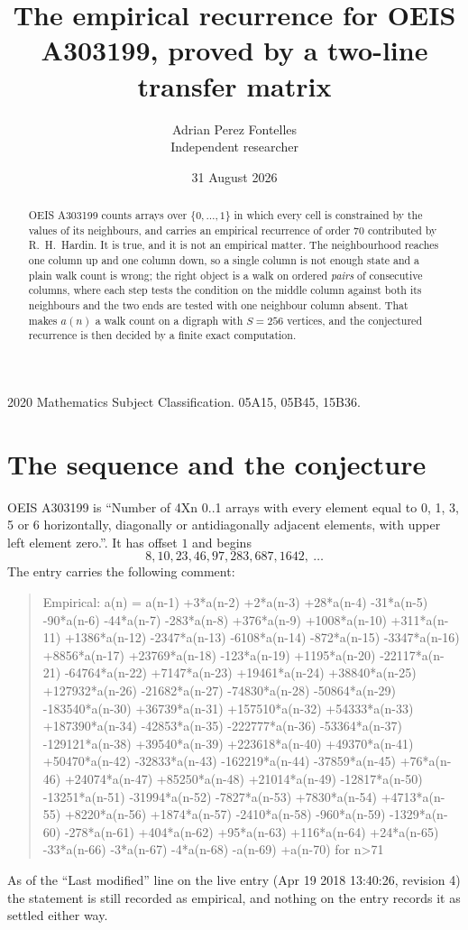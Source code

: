 \documentclass[11pt,a4paper]{article}
\title{The empirical recurrence for OEIS A303199, proved by a two-line transfer matrix}
\author{Adrian Perez Fontelles\\ \small Independent researcher}
\date{31 August 2026}
\theoremstyle{plain}
\theoremstyle{definition}
\begin{document}
\maketitle

\begin{abstract}
OEIS A303199 counts arrays over $\{0,\dots,1\}$ in which every cell is constrained by the
values of its neighbours, and carries an empirical recurrence of order $70$ contributed
by R.~H.~Hardin. It is true, and it is not an empirical matter. The neighbourhood reaches one
column up and one column down, so a single column is not enough state and a plain walk count
is wrong; the right object is a walk on ordered \emph{pairs} of consecutive columns, where
each step tests the condition on the middle column against both its neighbours and the two
ends are tested with one neighbour column absent. That makes $a(n)$ a walk count on a digraph
with $S=256$ vertices, and the conjectured recurrence is then decided by a finite exact
computation.
\end{abstract}

\noindent\small 2020 Mathematics Subject Classification. 05A15, 05B45, 15B36.\normalsize

\section{The sequence and the conjecture}

OEIS A303199 is ``Number of 4Xn 0..1 arrays with every element equal to 0, 1, 3, 5 or 6 horizontally, diagonally or antidiagonally adjacent elements, with upper left element zero.''. It has offset $1$ and begins
\[
8, 10, 23, 46, 97, 283, 687, 1642,\ \dots
\]
The entry carries the following comment:
\begin{quote}\small
Empirical: a(n) = a(n-1) +3*a(n-2) +2*a(n-3) +28*a(n-4) -31*a(n-5) -90*a(n-6) -44*a(n-7) -283*a(n-8) +376*a(n-9) +1008*a(n-10) +311*a(n-11) +1386*a(n-12) -2347*a(n-13) -6108*a(n-14) -872*a(n-15) -3347*a(n-16) +8856*a(n-17) +23769*a(n-18) -123*a(n-19) +1195*a(n-20) -22117*a(n-21) -64764*a(n-22) +7147*a(n-23) +19461*a(n-24) +38840*a(n-25) +127932*a(n-26) -21682*a(n-27) -74830*a(n-28) -50864*a(n-29) -183540*a(n-30) +36739*a(n-31) +157510*a(n-32) +54333*a(n-33) +187390*a(n-34) -42853*a(n-35) -222777*a(n-36) -53364*a(n-37) -129121*a(n-38) +39540*a(n-39) +223618*a(n-40) +49370*a(n-41) +50470*a(n-42) -32833*a(n-43) -162219*a(n-44) -37859*a(n-45) +76*a(n-46) +24074*a(n-47) +85250*a(n-48) +21014*a(n-49) -12817*a(n-50) -13251*a(n-51) -31994*a(n-52) -7827*a(n-53) +7830*a(n-54) +4713*a(n-55) +8220*a(n-56) +1874*a(n-57) -2410*a(n-58) -960*a(n-59) -1329*a(n-60) -278*a(n-61) +404*a(n-62) +95*a(n-63) +116*a(n-64) +24*a(n-65) -33*a(n-66) -3*a(n-67) -4*a(n-68) -a(n-69) +a(n-70) for n>71
\end{quote}
As of the ``Last modified'' line on the live entry (Apr 19 2018 13:40:26, revision 4) the statement is
still recorded as empirical, and nothing on the entry records it as settled either way.
\end{document}
